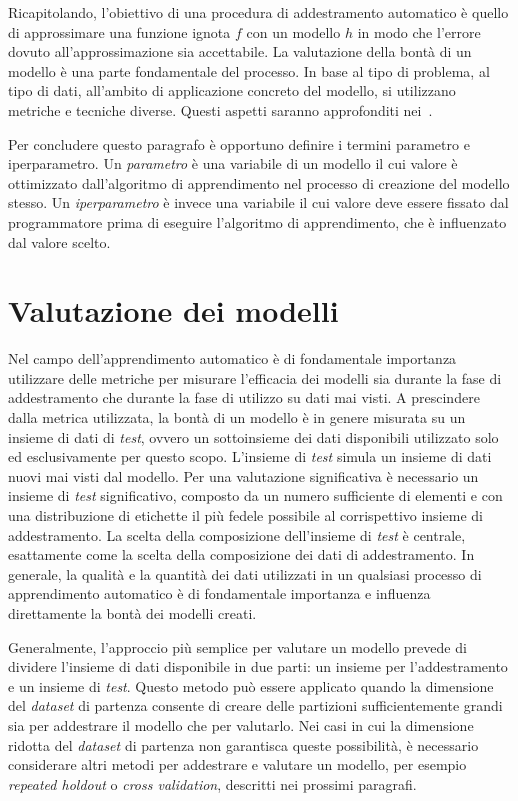 Ricapitolando, l'obiettivo di una procedura di addestramento automatico è quello di approssimare una funzione ignota $f$ con un modello $h$ in modo che l'errore dovuto all'approssimazione sia accettabile.
La valutazione della bontà di un modello è una parte fondamentale del processo.
In base al tipo di problema, al tipo di dati, all'ambito di applicazione concreto del modello, si utilizzano metriche e tecniche diverse.
Questi aspetti saranno approfonditi nei~.

Per concludere questo paragrafo è opportuno definire i termini parametro e iperparametro.
Un \emph{parametro} è una variabile di un modello il cui valore è ottimizzato dall'algoritmo di apprendimento nel processo di creazione del modello stesso. 
Un \emph{iperparametro} è invece una variabile il cui valore deve essere fissato dal programmatore prima di eseguire l'algoritmo di apprendimento, che è influenzato dal valore scelto.

\section{Valutazione dei modelli}\label{sec:valutazione_modelli}
Nel campo dell'apprendimento automatico è di fondamentale importanza utilizzare delle metriche per misurare l'efficacia dei modelli sia durante la fase di addestramento che durante la fase di utilizzo su dati mai visti.
A prescindere dalla metrica utilizzata, la bontà di un modello è in genere misurata su un insieme di dati di \emph{test}, ovvero un sottoinsieme dei dati disponibili utilizzato solo ed esclusivamente per questo scopo.
L'insieme di \emph{test} simula un insieme di dati nuovi mai visti dal modello.
Per una valutazione significativa è necessario un insieme di \emph{test} significativo, composto da un numero sufficiente di elementi e con una distribuzione di etichette il più fedele possibile al corrispettivo insieme di addestramento.
La scelta della composizione dell'insieme di \emph{test} è centrale, esattamente come la scelta della composizione dei dati di addestramento.
In generale, la qualità e la quantità dei dati utilizzati in un qualsiasi processo di apprendimento automatico è di fondamentale importanza e influenza direttamente la bontà dei modelli creati.

Generalmente, l'approccio più semplice per valutare un modello prevede di dividere l'insieme di dati disponibile in due parti: un insieme per l'addestramento e un insieme di \emph{test}. 
Questo metodo può essere applicato quando la dimensione del \emph{dataset} di partenza consente di creare delle partizioni sufficientemente grandi sia per addestrare il modello che per valutarlo.
Nei casi in cui la dimensione ridotta del \emph{dataset} di partenza non garantisca queste possibilità, è necessario considerare altri metodi per addestrare e valutare un modello, per esempio \emph{repeated holdout} o \emph{cross validation}, descritti nei prossimi paragrafi.

